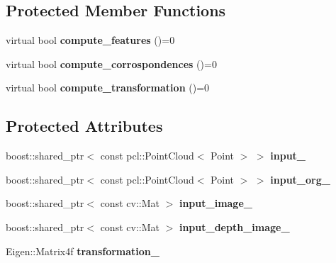 \subsection*{Protected Member Functions}
\begin{DoxyCompactItemize}
\item 
\hypertarget{classGeneralRegistration_a94d7c0dd8543687ae9e8421ac748aa4f}{
virtual bool {\bfseries compute\_\-features} ()=0}
\label{classGeneralRegistration_a94d7c0dd8543687ae9e8421ac748aa4f}

\item 
\hypertarget{classGeneralRegistration_aa2fc4bfbc908fd44b1eed39bab026e15}{
virtual bool {\bfseries compute\_\-corrospondences} ()=0}
\label{classGeneralRegistration_aa2fc4bfbc908fd44b1eed39bab026e15}

\item 
\hypertarget{classGeneralRegistration_a689e345417d73a82f1bf7d500b5805c4}{
virtual bool {\bfseries compute\_\-transformation} ()=0}
\label{classGeneralRegistration_a689e345417d73a82f1bf7d500b5805c4}

\end{DoxyCompactItemize}
\subsection*{Protected Attributes}
\begin{DoxyCompactItemize}
\item 
\hypertarget{classGeneralRegistration_ab4dc735822c32d0496aa7b84e845bf29}{
boost::shared\_\-ptr$<$ const pcl::PointCloud$<$ Point $>$ $>$ {\bfseries input\_\-}}
\label{classGeneralRegistration_ab4dc735822c32d0496aa7b84e845bf29}

\item 
\hypertarget{classGeneralRegistration_a82b4489bc709fd88197929f0a450c95d}{
boost::shared\_\-ptr$<$ const pcl::PointCloud$<$ Point $>$ $>$ {\bfseries input\_\-org\_\-}}
\label{classGeneralRegistration_a82b4489bc709fd88197929f0a450c95d}

\item 
\hypertarget{classGeneralRegistration_ad2933061cf77cdca3ae2df27048414c6}{
boost::shared\_\-ptr$<$ const cv::Mat $>$ {\bfseries input\_\-image\_\-}}
\label{classGeneralRegistration_ad2933061cf77cdca3ae2df27048414c6}

\item 
\hypertarget{classGeneralRegistration_acb62a0b225a3c4fdb6e22696156a249f}{
boost::shared\_\-ptr$<$ const cv::Mat $>$ {\bfseries input\_\-depth\_\-image\_\-}}
\label{classGeneralRegistration_acb62a0b225a3c4fdb6e22696156a249f}

\item 
\hypertarget{classGeneralRegistration_a6cbc0cdb17ce37dab567abce1aad3d2c}{
Eigen::Matrix4f {\bfseries transformation\_\-}}
\label{classGeneralRegistration_a6cbc0cdb17ce37dab567abce1aad3d2c}

\end{DoxyCompactItemize}


